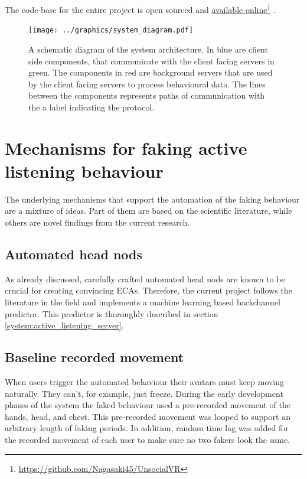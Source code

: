 \documentclass[]{simple-thesis}
\newcommand\fnurl[2]{%
  \href{#2}{#1}\footnote{\url{#2}}%
}
\begin{document}
The code-base for the entire project is open sourced and \fnurl{available online}{https://github.com/Nagasaki45/UnsocialVR}.

\begin{figure}
  \texttt{[image: ../graphics/system\_diagram.pdf]}
  \caption{A schematic diagram of the system architecture. In blue are client side components, that communicate with the client facing servers in green. The components in red are background servers that are used by the client facing servers to process behavioural data. The lines between the components represents paths of communication with the a label indicating the protocol.}
  \label{fig:system:diagram}
\end{figure}

\section{Mechanisms for faking active listening behaviour}\label{system:mechanisms}

The underlying mechanisms that support the automation of the faking behaviour are a mixture of ideas.
Part of them are based on the scientific literature, while others are novel findings from the current research.

\subsection{Automated head nods}

As already discussed, carefully crafted automated head nods are known to be crucial for creating convincing ECAs.
Therefore, the current project follows the literature in the field and implements a machine learning based backchannel predictor.
This predictor is thoroughly described in section \ref{system:active_listening_server}.

\subsection{Baseline recorded movement}

When users trigger the automated behaviour their avatars must keep moving naturally.
They can't, for example, just freeze.
During the early development phases of the system the faked behaviour used a pre-recorded movement of the hands, head, and chest.
This pre-recorded movement was looped to support an arbitrary length of faking periods.
In addition, random time lag was added for the recorded movement of each user to make sure no two fakers look the same.
\end{document}
